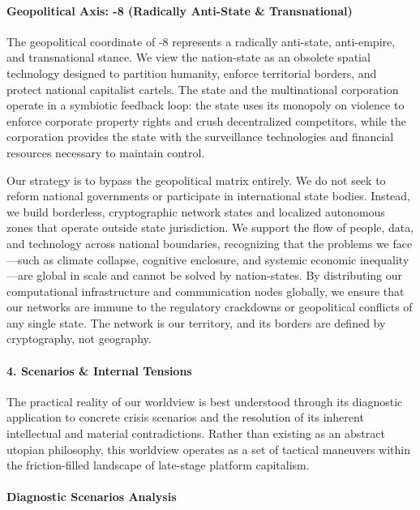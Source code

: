 \paragraph{Geopolitical Axis: -8 (Radically Anti-State \&
Transnational)}\label{geopolitical-axis--8-radically-anti-state-transnational}

The geopolitical coordinate of -8 represents a radically anti-state,
anti-empire, and transnational stance. We view the nation-state as an
obsolete spatial technology designed to partition humanity, enforce
territorial borders, and protect national capitalist cartels. The state
and the multinational corporation operate in a symbiotic feedback loop:
the state uses its monopoly on violence to enforce corporate property
rights and crush decentralized competitors, while the corporation
provides the state with the surveillance technologies and financial
resources necessary to maintain control.

Our strategy is to bypass the geopolitical matrix entirely. We do not
seek to reform national governments or participate in international
state bodies. Instead, we build borderless, cryptographic network states
and localized autonomous zones that operate outside state jurisdiction.
We support the flow of people, data, and technology across national
boundaries, recognizing that the problems we face---such as climate
collapse, cognitive enclosure, and systemic economic inequality---are
global in scale and cannot be solved by nation-states. By distributing
our computational infrastructure and communication nodes globally, we
ensure that our networks are immune to the regulatory crackdowns or
geopolitical conflicts of any single state. The network is our
territory, and its borders are defined by cryptography, not geography.

\paragraph{4. Scenarios \& Internal
Tensions}\label{scenarios-internal-tensions-13}

The practical reality of our worldview is best understood through its
diagnostic application to concrete crisis scenarios and the resolution
of its inherent intellectual and material contradictions. Rather than
existing as an abstract utopian philosophy, this worldview operates as a
set of tactical maneuvers within the friction-filled landscape of
late-stage platform capitalism.

\paragraph{Diagnostic Scenarios
Analysis}\label{diagnostic-scenarios-analysis}

